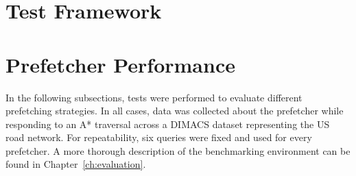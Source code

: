 
\section{Test Framework}

\section{Prefetcher Performance}

In the following subsections, tests were performed to
evaluate different prefetching strategies. In all cases, data was collected
about the prefetcher while responding to an A* traversal across a DIMACS
dataset representing the US road network\cite{dimacs}. For repeatability, six
queries were fixed and used for every prefetcher. A more thorough description
of the benchmarking environment can be found in Chapter~\ref{ch:evaluation}.


